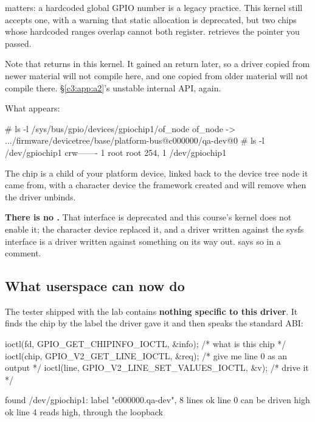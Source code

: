 \noindent {} matters: a hardcoded global GPIO number is a legacy practice. This
kernel still accepts one, with a warning that static allocation is deprecated, but two chips whose
hardcoded ranges overlap cannot both register.  retrieves the pointer
you passed.

Note that  returns  in this kernel. It gained an  return later, so a
driver copied from newer material will not compile here, and one copied from older material will not
compile there. \S\ref{c3:app:a2}'s unstable internal API, again.

What appears:

\begin{console}
# ls -l /sys/bus/gpio/devices/gpiochip1/of_node
of_node -> .../firmware/devicetree/base/platform-bus@c000000/qa-dev@0
# ls -l /dev/gpiochip1
crw------- 1 root root 254, 1 /dev/gpiochip1
\end{console}

\noindent The chip is a child of your platform device, linked back to the device tree node it came
from, with a character device the framework created and will remove when the driver unbinds.

\textbf{There is no .} That interface is deprecated and this course's kernel
does not enable it; the character device replaced it, and a driver written against the sysfs
interface is a driver written against something on its way out.  says so in a
comment.

\subsection{What userspace can now do}
\label{c11:app:a6}

The tester shipped with the lab contains \textbf{nothing specific to this driver}. It finds the chip
by the label the driver gave it and then speaks the standard ABI:

\begin{ccode}
ioctl(fd, GPIO_GET_CHIPINFO_IOCTL, &info);        /* what is this chip */
ioctl(chip, GPIO_V2_GET_LINE_IOCTL, &req);        /* give me line 0 as an output */
ioctl(line, GPIO_V2_LINE_SET_VALUES_IOCTL, &v);   /* drive it */
\end{ccode}

\begin{console}
found /dev/gpiochip1: label "c000000.qa-dev", 8 lines
  ok  line 0 can be driven high
  ok  line 4 reads high, through the loopback
\end{console}

